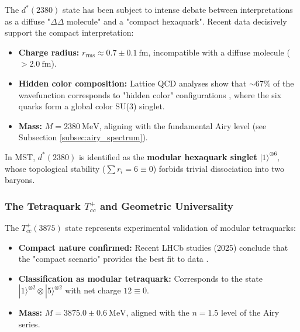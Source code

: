 \documentclass[11pt, a4paper]{article}
\theoremstyle{plain}
\theoremstyle{definition}
\begin{document}
The $d^*(2380)$ state has been subject to intense debate between interpretations as a diffuse "$\Delta\Delta$ molecule" and a "compact hexaquark". Recent data \cite{Bashkanov2024} decisively support the compact interpretation:

\begin{itemize}
    \item \textbf{Charge radius:} $r_{\text{rms}} \approx 0.7 \pm 0.1\ \si{\femto\meter}$, incompatible with a diffuse molecule ($>2.0\ \si{\femto\meter}$).
    
    \item \textbf{Hidden color composition:} Lattice QCD analyses show that $\sim 67\%$ of the wavefunction corresponds to "hidden color" configurations \cite{Lu2017}, where the six quarks form a global color SU(3) singlet.
    
    \item \textbf{Mass:} $M = 2380\ \si{\mega\electronvolt}$, aligning with the fundamental Airy level (see Subsection \ref{subsec:airy_spectrum}).
\end{itemize}

In MST, $d^*(2380)$ is identified as the \textbf{modular hexaquark singlet} $|1\rangle^{\otimes 6}$, whose topological stability ($\sum r_i = 6 \equiv 0$) forbids trivial dissociation into two baryons.

\subsubsection{The Tetraquark \texorpdfstring{$T_{cc}^+$}{Tcc+} and Geometric Universality}

The $T_{cc}^+(3875)$ state represents experimental validation of modular tetraquarks:

\begin{itemize}
    \item \textbf{Compact nature confirmed:} Recent LHCb studies (2025) conclude that the "compact scenario" provides the best fit to data \cite{Harada2025}.
    
    \item \textbf{Classification as modular tetraquark:} Corresponds to the state $|1\rangle^{\otimes 2} \otimes |5\rangle^{\otimes 2}$ with net charge $12 \equiv 0$.
    
    \item \textbf{Mass:} $M = 3875.0 \pm 0.6\ \si{\mega\electronvolt}$, aligned with the $n=1.5$ level of the Airy series.
\end{itemize}
\end{document}
